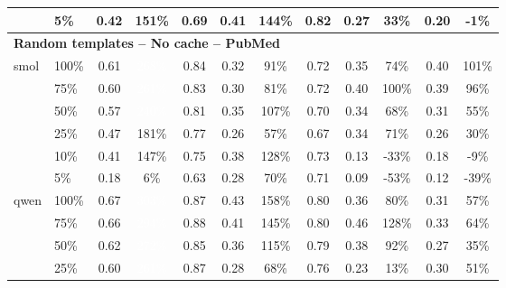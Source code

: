 \begin{longtable}{llcccccccccc}
 & 5\% & 0.42 & \cellcolor{tablegreen!43}151\% & 0.69 & 0.41 & \cellcolor{tablegreen!41}144\% & 0.82 & 0.27 & \cellcolor{tablegreen!9}33\% & 0.20 & \cellcolor[HTML]{E8A0A0}-1\% \\
\midrule
\multicolumn{12}{l}{\textbf{Random templates -- No cache -- PubMed}} \\
\multirow{6}{*}{smol} & 100\% & 0.61 & \cellcolor{tablegreen!77}\textcolor{white}{268\%} & 0.84 & 0.32 & \cellcolor{tablegreen!26}91\% & 0.72 & 0.35 & \cellcolor{tablegreen!21}74\% & 0.40 & \cellcolor{tablegreen!29}101\% \\
 & 75\% & 0.60 & \cellcolor{tablegreen!75}\textcolor{white}{261\%} & 0.83 & 0.30 & \cellcolor{tablegreen!23}81\% & 0.72 & 0.40 & \cellcolor{tablegreen!29}100\% & 0.39 & \cellcolor{tablegreen!27}96\% \\
 & 50\% & 0.57 & \cellcolor{tablegreen!68}\textcolor{white}{240\%} & 0.81 & 0.35 & \cellcolor{tablegreen!31}107\% & 0.70 & 0.34 & \cellcolor{tablegreen!19}68\% & 0.31 & \cellcolor{tablegreen!16}55\% \\
 & 25\% & 0.47 & \cellcolor{tablegreen!52}181\% & 0.77 & 0.26 & \cellcolor{tablegreen!16}57\% & 0.67 & 0.34 & \cellcolor{tablegreen!20}71\% & 0.26 & \cellcolor{tablegreen!9}30\% \\
 & 10\% & 0.41 & \cellcolor{tablegreen!42}147\% & 0.75 & 0.38 & \cellcolor{tablegreen!37}128\% & 0.73 & 0.13 & \cellcolor[HTML]{E8A0A0}-33\% & 0.18 & \cellcolor[HTML]{E8A0A0}-9\% \\
 & 5\% & 0.18 & \cellcolor{tablegreen!2}6\% & 0.63 & 0.28 & \cellcolor{tablegreen!20}70\% & 0.71 & 0.09 & \cellcolor[HTML]{E8A0A0}-53\% & 0.12 & \cellcolor[HTML]{E8A0A0}-39\% \\
\cmidrule(l){1-12}
\multirow{6}{*}{qwen} & 100\% & 0.67 & \cellcolor{tablegreen!86}\textcolor{white}{303\%} & 0.87 & 0.43 & \cellcolor{tablegreen!45}158\% & 0.80 & 0.36 & \cellcolor{tablegreen!23}80\% & 0.31 & \cellcolor{tablegreen!16}57\% \\
 & 75\% & 0.66 & \cellcolor{tablegreen!84}\textcolor{white}{294\%} & 0.88 & 0.41 & \cellcolor{tablegreen!42}145\% & 0.80 & 0.46 & \cellcolor{tablegreen!37}128\% & 0.33 & \cellcolor{tablegreen!18}64\% \\
 & 50\% & 0.62 & \cellcolor{tablegreen!78}\textcolor{white}{272\%} & 0.85 & 0.36 & \cellcolor{tablegreen!33}115\% & 0.79 & 0.38 & \cellcolor{tablegreen!26}92\% & 0.27 & \cellcolor{tablegreen!10}35\% \\
 & 25\% & 0.60 & \cellcolor{tablegreen!75}\textcolor{white}{261\%} & 0.87 & 0.28 & \cellcolor{tablegreen!20}68\% & 0.76 & 0.23 & \cellcolor{tablegreen!4}13\% & 0.30 & \cellcolor{tablegreen!14}51\% \\

\end{longtable}
